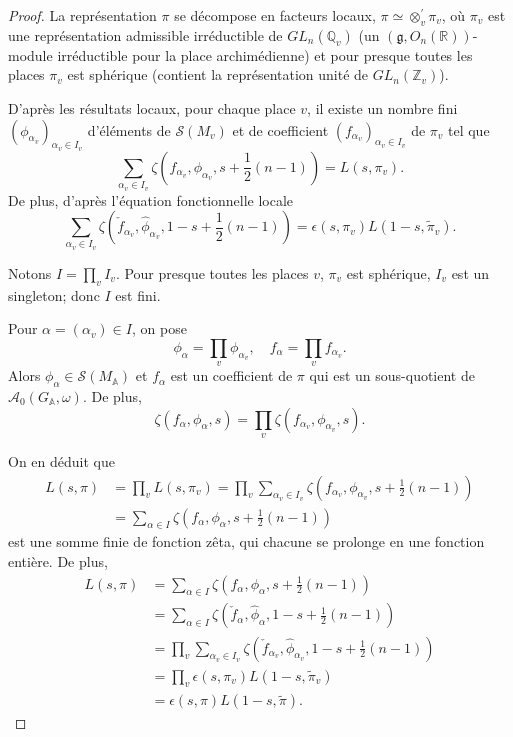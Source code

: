 \begin{proof}
La représentation $\pi$ se décompose en facteurs locaux,
$\pi \simeq \otimes_v^{'} \pi_v$, où $\pi_v$ est une représentation admissible irréductible de $GL_n(\mathbb{Q}_v)$ (un $(\mathfrak{g}, O_n(\mathbb{R}))$-module irréductible pour la place archimédienne) et pour presque toutes les places $\pi_v$ est sphérique (contient la représentation unité de $GL_n(\mathbb{Z}_v)$).

D'après les résultats locaux, pour chaque place $v$, il existe un nombre fini $(\phi_{\alpha_v})_{\alpha_v \in I_v}$ d'éléments de $\mathcal{S}(M_v)$ et de coefficient $(f_{\alpha_v})_{\alpha_v \in I_v}$ de $\pi_v$ tel que
\begin{equation}
\sum_{\alpha_v \in I_v} \zeta(f_{\alpha_v}, \phi_{\alpha_v}, s + \frac{1}{2}(n-1)) = L(s, \pi_v).
\end{equation}
De plus, d'après l'équation fonctionnelle locale
\begin{equation}
\sum_{\alpha_v \in I_v} \zeta(\check{f}_{\alpha_v}, \hat{\phi}_{\alpha_v}, 1-s + \frac{1}{2}(n-1)) = \epsilon(s,\pi_v)L(1-s, \tilde{\pi}_v).
\end{equation}

Notons $I = \prod_v I_v$. Pour presque toutes les places $v$, $\pi_v$ est sphérique, $I_v$ est un singleton; donc $I$ est fini.

Pour $\alpha = (\alpha_v) \in I$, on pose
\begin{equation}
\phi_\alpha = \prod_v \phi_{\alpha_v}, \quad f_\alpha = \prod_v f_{\alpha_v}.
\end{equation}
Alors $\phi_\alpha \in \mathcal{S}(M_\mathbb{A})$ et $f_\alpha$ est un coefficient de $\pi$ qui est un sous-quotient de $\mathcal{A}_0(G_\mathbb{A}, \omega)$. De plus,
\begin{equation}
\zeta(f_\alpha, \phi_\alpha, s) = \prod_v \zeta(f_{\alpha_v}, \phi_{\alpha_v}, s).
\end{equation}

On en déduit que
\begin{align}
L(s, \pi) &= \prod_v L(s, \pi_v) = \prod_v \sum_{\alpha_v \in I_v} \zeta(f_{\alpha_v}, \phi_{\alpha_v}, s + \frac{1}{2}(n-1)) \\
&= \sum_{\alpha \in I} \zeta(f_\alpha, \phi_\alpha, s + \frac{1}{2}(n-1))
\end{align}
est une somme finie de fonction zêta, qui chacune se prolonge en une fonction entière. De plus,
\begin{align}
L(s, \pi) &= \sum_{\alpha \in I} \zeta(f_\alpha, \phi_\alpha, s + \frac{1}{2}(n-1)) \\
&= \sum_{\alpha \in I} \zeta(\check{f}_\alpha, \hat{\phi}_\alpha, 1 - s + \frac{1}{2}(n-1)) \\
&= \prod_v \sum_{\alpha_v \in I_v} \zeta(\check{f}_{\alpha_v}, \hat{\phi}_{\alpha_v}, 1-s + \frac{1}{2}(n-1)) \\
&= \prod_v \epsilon(s, \pi_v) L(1-s, \tilde{\pi}_v) \\
&= \epsilon(s, \pi)L(1-s, \tilde{\pi}).
\end{align}
\end{proof}